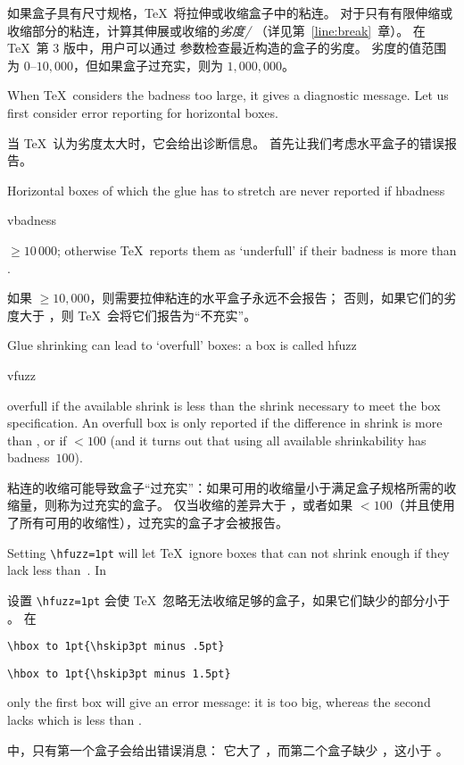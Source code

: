 如果盒子具有尺寸规格，\TeX\ 将拉伸或收缩盒子中的粘连。
对于只有有限伸缩或收缩部分的粘连，计算其伸展或收缩的{\em 劣度/}
（详见第~\ref{line:break}~章）。
在 \TeX\ 第 3 版中，用户可以通过  参数检查最近构造的盒子的劣度。
劣度的值范围为 0--$10,000$，但如果盒子过充实，则为 $1,000,000$。

When \TeX\ considers the badness too large,
it gives a diagnostic message. Let us first consider error reporting
for horizontal boxes.

当 \TeX\ 认为劣度太大时，它会给出诊断信息。
首先让我们考虑水平盒子的错误报告。


Horizontal boxes of which the glue has to stretch are never reported if
\cstoidx hbadness\par\cstoidx vbadness\par
{}${}\geq10\,000$; otherwise \TeX\ reports them
as `underfull' if their badness is more than .

如果 ${}\geq10,000$，则需要拉伸粘连的水平盒子永远不会报告；
否则，如果它们的劣度大于 ，则 \TeX\ 会将它们报告为“不充实”。


Glue shrinking can lead to `overfull' boxes: a box is called
\cstoidx hfuzz\par\cstoidx vfuzz\par
overfull if the available shrink is less than the shrink
necessary to meet the box specification. An overfull box
is only reported if the difference in shrink is more than
, or if ${}<100$ (and it turns out that
using all available shrinkability has badness~$100$).

粘连的收缩可能导致盒子“过充实”：如果可用的收缩量小于满足盒子规格所需的收缩量，则称为过充实的盒子。
仅当收缩的差异大于 ，或者如果 ${}<100$（并且使用了所有可用的收缩性），过充实的盒子才会被报告。


\begin{example} Setting \verb>\hfuzz=1pt> will let \TeX\ ignore
boxes that can not shrink enough if they lack less than~\n{1pt}.
In 

设置 \verb>\hfuzz=1pt> 会使 \TeX\ 忽略无法收缩足够的盒子，如果它们缺少的部分小于 \n{1pt}。
在\begin{verbatim}
\hbox to 1pt{\hskip3pt minus .5pt}
\end{verbatim}
\awp
\begin{verbatim}
\hbox to 1pt{\hskip3pt minus 1.5pt}
\end{verbatim}
only the first box will give an error message:
it is \n{1.5pt} too big, whereas the second lacks
\n{.5pt} which is less than .

中，只有第一个盒子会给出错误消息：
它大了 \n{1.5pt}，而第二个盒子缺少 \n{.5pt}，这小于 。
\end{example}

